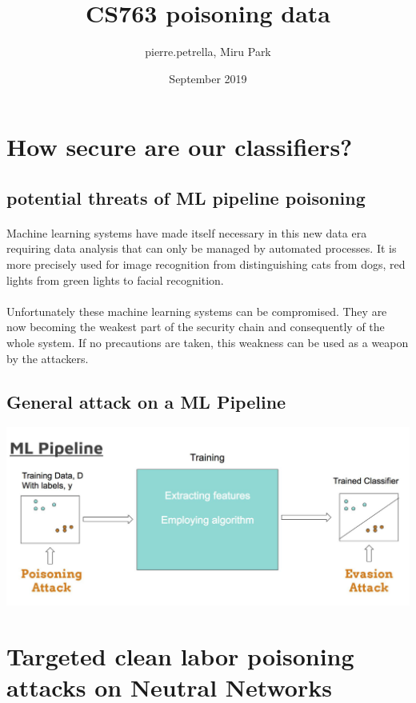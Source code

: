 \documentclass{article}
\title{CS763 poisoning data}
\author{pierre.petrella, Miru Park }
\date{September 2019}
\begin{document}
\maketitle
\tableofcontents
\newpage
\section*{How secure are our classifiers? }
\subsection {potential threats of ML pipeline poisoning}
\paragraph{}
Machine learning systems have made itself necessary in this new data era requiring data analysis that can only be managed by automated processes. It is more precisely used for image recognition from distinguishing cats from dogs, red lights from green lights to facial recognition. 
\paragraph{}
Unfortunately these machine learning systems can be compromised. They are now becoming the weakest part of the security chain and consequently of the whole system. If no precautions are taken, this weakness can be used as a weapon by the attackers.

\subsection{General attack on a ML Pipeline}
\includegraphics[scale=0.3]{MLpipeline.png}
\section{Targeted clean labor poisoning attacks on Neutral Networks}
\end{document}
